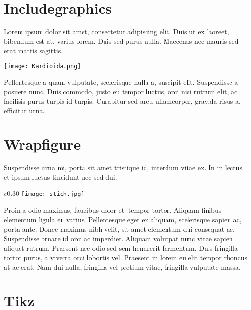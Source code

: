 \documentclass[a4paper, 12pt]{amsart}
\author{PS}
\begin{document}
\section{Includegraphics}
Lorem ipsum dolor sit amet, consectetur adipiscing elit. Duis ut ex laoreet, bibendum est at, varius lorem. Duis sed purus nulla. Maecenas nec mauris sed erat mattis sagittis.
\begin{center}
\texttt{[image: Kardioida.png]}
\end{center}
\par Pellentesque a quam vulputate, scelerisque nulla a, suscipit elit. Suspendisse a posuere nunc. Duis commodo, justo eu tempor luctus, orci nisi rutrum elit, ac facilisis purus turpis id turpis. Curabitur sed arcu ullamcorper, gravida risus a, efficitur urna.
\newpage
\section{Wrapfigure}
Suspendisse urna mi, porta sit amet tristique id, interdum vitae ex. In in lectus et ipsum luctus tincidunt nec sed dui.
\begin{wrapfigure}{c}{0.30\textwidth}
\texttt{[image: stich.jpg]}
\end{wrapfigure}
Proin a odio maximus, faucibus dolor et, tempor tortor. Aliquam finibus elementum ligula eu varius. Pellentesque eget ex aliquam, scelerisque sapien ac, porta ante. Donec maximus nibh velit, sit amet elementum dui consequat ac. Suspendisse ornare id orci ac imperdiet. Aliquam volutpat nunc vitae sapien aliquet rutrum. Praesent nec odio sed sem hendrerit fermentum. Duis fringilla tortor purus, a viverra orci lobortis vel. Praesent in lorem eu elit tempor rhoncus at ac erat. Nam dui nulla, fringilla vel pretium vitae, fringilla vulputate massa.
\section{Tikz}

\begin{figure}[ht]
\end{figure}
\end{document}
